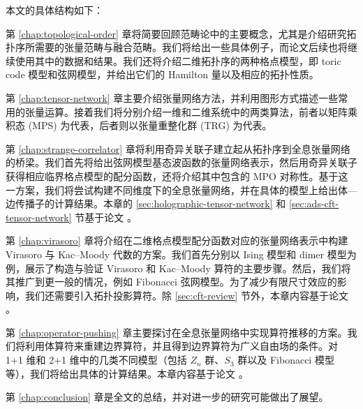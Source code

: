 本文的具体结构如下：

第 \ref{chap:topological-order} 章将简要回顾范畴论中的主要概念，尤其是介绍研究拓扑序所需要的张量范畴与融合范畴。我们将给出一些具体例子，而论文后续也将继续使用其中的数据和结果。我们还将介绍二维拓扑序的两种格点模型，即 toric code 模型和弦网模型，并给出它们的 Hamilton 量以及相应的拓扑性质。

第 \ref{chap:tensor-network} 章主要介绍张量网络方法，并利用图形方式描述一些常用的张量运算。接着我们将分别介绍一维和二维系统中的两类算法，前者以矩阵乘积态 (MPS) 为代表，后者则以张量重整化群 (TRG) 为代表。

第 \ref{chap:strange-correlator} 章将利用奇异关联子建立起从拓扑序到全息张量网络的桥梁。我们首先将给出弦网模型基态波函数的张量网络表示，然后用奇异关联子获得相应临界格点模型的配分函数，还将介绍其中包含的 MPO 对称性。基于这一方案，我们将尝试构建不同维度下的全息张量网络，并在具体的模型上给出体—边传播子的计算结果。本章的 \ref{sec:holographic-tensor-network} 和 \ref{sec:ads-cft-tensor-network} 节基于论文 \parencite{chen2022exact}。

第 \ref{chap:virasoro} 章将介绍在二维格点模型配分函数对应的张量网络表示中构建 Virasoro 与 Kac--Moody 代数的方案。我们首先分别以 Ising 模型和 dimer 模型为例，展示了构造与验证 Virasoro 和 Kac--Moody 算符的主要步骤。然后，我们将其推广到更一般的情况，例如 Fibonacci 弦网模型。为了减少有限尺寸效应的影响，我们还需要引入拓扑投影算符。除 \ref{sec:cft-review} 节外，本章内容基于论文 \parencite{wang2022virasoro,zeng2023virasoro}。

第 \ref{chap:operator-pushing} 章主要探讨在全息张量网络中实现算符推移的方案。我们将利用体算符来重建边界算符，并且得到边界算符为广义自由场的条件。对 1+1 维和 2+1 维中的几类不同模型（包括 $Z_n$ 群、$S_3$ 群以及 Fibonacci 模型等），我们将给出具体的计算结果。本章内容基于论文 \parencite{zeng2023bulk}。

第 \ref{chap:conclusion} 章是全文的总结，并对进一步的研究可能做出了展望。

\endgroup
